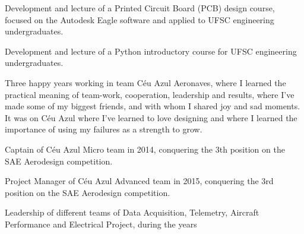 \documentclass[A4]{deedy-resume} %
\begin{document}
\hfill
\begin{minipage}[t]{0.67\textwidth} %

\vspace{\topsep} %

\vspace{\topsep} %
\begin{tightitemize}
\item Development and lecture of a Printed Circuit Board (PCB) design course, focused on the Autodesk Eagle software and applied to UFSC engineering undergraduates. 
\end{tightitemize}
\sectionspace %
\vspace{\topsep} %
\begin{tightitemize}
\item Development and lecture of a Python introductory course for UFSC engineering undergraduates. 
\end{tightitemize}
\sectionspace %

\vspace{\topsep} %
\begin{tightitemize}
\item Three happy years working in team Céu Azul Aeronaves, where I learned the practical meaning of team-work, cooperation, leadership and results, where I've made some of my biggest friends, and with whom I shared joy and sad moments. It was on Céu Azul where I've learned to love designing and where I learned the importance of using my failures as a strength to grow.
\newline{}
\begin{tightitemize}
\item Captain of Céu Azul Micro team in 2014, conquering the 3th position on the SAE Aerodesign competition.
\item Project Manager of Céu Azul Advanced team in 2015, conquering the 3rd position on the SAE Aerodesign competition.
\item Leadership of different teams of Data Acquisition, Telemetry, Aircraft Performance and Electrical Project, during the years
\end{tightitemize}


\end{tightitemize}
\end{minipage}
\end{document}

